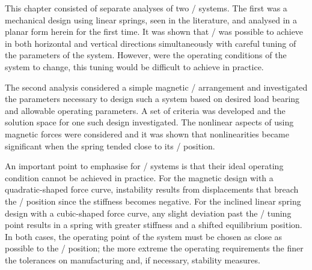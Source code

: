 \documentclass[11pt,a4paper]{memoir}
\begin{document}
This chapter consisted of separate analyses of two \qzs/ systems.
The first was a mechanical design using linear springs, seen in the literature, and analysed in a planar form herein for the first time.
It was shown that \qzs/ was possible to achieve in both horizontal and vertical directions simultaneously with careful tuning of the parameters of the system.
However, were the operating conditions of the system to change, this tuning would be difficult to achieve in practice.

The second analysis considered a simple magnetic \qzs/ arrangement and investigated the parameters necessary to design such a system based on desired load bearing and allowable operating parameters.
A set of criteria was developed and the solution space for one such design investigated.
The nonlinear aspects of using magnetic forces were considered and it was shown that nonlinearities became significant when the spring tended close to its \qzs/ position.

An important point to emphasise for \qzs/ systems is that their ideal operating condition  cannot be achieved in practice.
For the magnetic design with a quadratic-shaped force curve, instability results from displacements that breach the \qzs/ position since the stiffness becomes negative.
For the inclined linear spring design with a cubic-shaped force curve, any slight deviation past the \qzs/ tuning point results in a spring with greater stiffness and a shifted equilibrium position.
In both cases, the operating point of the system must be chosen as close as possible to the \qzs/ position; the more extreme the operating requirements the finer the tolerances on manufacturing and, if necessary, stability measures.
\end{document}
